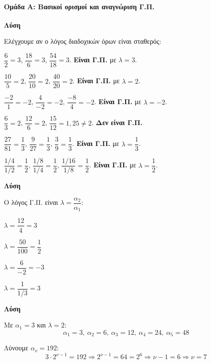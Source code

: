 \documentclass[11pt,a4paper,modern]{FFExercises}
\begin{document}


\paragraph{Ομάδα Α: Βασικοί ορισμοί και αναγνώριση Γ.Π.}

\askhsh
\textbf{Λύση}

Ελέγχουμε αν ο λόγος διαδοχικών όρων είναι σταθερός:
\begin{alist}
  \item $\dfrac{6}{2} = 3$, $\dfrac{18}{6} = 3$, $\dfrac{54}{18} = 3$. \textbf{Είναι Γ.Π.} με $\lambda = 3$.
  \item $\dfrac{10}{5} = 2$, $\dfrac{20}{10} = 2$, $\dfrac{40}{20} = 2$. \textbf{Είναι Γ.Π.} με $\lambda = 2$.
  \item $\dfrac{-2}{1} = -2$, $\dfrac{4}{-2} = -2$, $\dfrac{-8}{4} = -2$. \textbf{Είναι Γ.Π.} με $\lambda = -2$.
  \item $\dfrac{6}{3} = 2$, $\dfrac{12}{6} = 2$, $\dfrac{15}{12} = 1{,}25 \neq 2$. \textbf{Δεν είναι Γ.Π.}
  \item $\dfrac{27}{81} = \dfrac{1}{3}$, $\dfrac{9}{27} = \dfrac{1}{3}$, $\dfrac{3}{9} = \dfrac{1}{3}$. \textbf{Είναι Γ.Π.} με $\lambda = \dfrac{1}{3}$.
  \item $\dfrac{1/4}{1/2} = \dfrac{1}{2}$, $\dfrac{1/8}{1/4} = \dfrac{1}{2}$, $\dfrac{1/16}{1/8} = \dfrac{1}{2}$. \textbf{Είναι Γ.Π.} με $\lambda = \dfrac{1}{2}$.
\end{alist}

\askhsh
\textbf{Λύση}

Ο λόγος Γ.Π. είναι $\lambda = \dfrac{\alpha_2}{\alpha_1}$:
\begin{alist}
  \item $\lambda = \dfrac{12}{4} = 3$
  \item $\lambda = \dfrac{50}{100} = \dfrac{1}{2}$
  \item $\lambda = \dfrac{6}{-2} = -3$
  \item $\lambda = \dfrac{1}{1/3} = 3$
\end{alist}

\askhsh
\textbf{Λύση}
\begin{alist}
  \item Με $\alpha_1 = 3$ και $\lambda = 2$:
  \[
  \alpha_1 = 3,\ \alpha_2 = 6,\ \alpha_3 = 12,\ \alpha_4 = 24,\ \alpha_5 = 48
  \]
  
  \item Λύνουμε $\alpha_\nu = 192$:
  \[
  3 \cdot 2^{\nu-1} = 192 \Rightarrow 2^{\nu-1} = 64 = 2^6 \Rightarrow \nu - 1 = 6 \Rightarrow \nu = 7
  \]
\end{alist}
\end{document}

